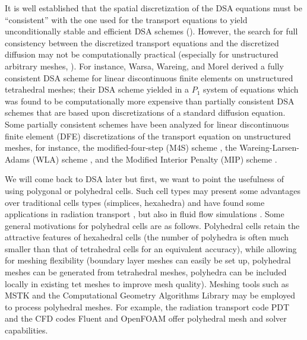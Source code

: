 It is well established that the spatial discretization of the DSA equations
must be ``consistent'' with the one used for the \sn transport equations to
yield unconditionally stable and efficient DSA schemes
(\cite{dsa_ref,larsen_dsa,consistent_p1,m4s,wla,mip}). However, the search for full
consistency between the discretized transport equations and the discretized
diffusion may not be computationally practical (especially for unstructured
arbitrary meshes, \cite{dsa_ref}). For instance, Warsa, Wareing, and
Morel \cite{consistent_p1} derived a fully consistent DSA scheme for linear
discontinuous finite elements on unstructured tetrahedral meshes; their DSA
scheme yielded in a $P_1$ system of equations which was found to be
computationally more expensive than partially consistent DSA schemes that are
based upon discretizations of a standard diffusion equation. Some partially 
consistent schemes have been analyzed for linear discontinuous finite element
(DFE) discretizations of the transport equation on unstructured meshes, for
instance, the modified-four-step (M4S) scheme \cite{m4s}, the
Wareing-Larsen-Adams (WLA) scheme \cite{wla}, and the Modified Interior
Penalty (MIP) scheme \cite{mip}.


We will come back to DSA later but first, we want to point the usefulness of
using polygonal or polyhedral cells. Such cell types may present some advantages over
traditional cells types (simplices, hexahedra) and have found some
applications in radiation transport \cite{pwld_2d,pwld_3d,cfm_dfm}, but also in fluid
flow simulations \cite{fluent,fluent2,fluentbio}. Some general motivations for
polyhedral cells are as follows. Polyhedral cells retain the attractive
features of hexahedral
cells  (the number of polyhedra is often much smaller than that of tetrahedral
cells for an equivalent accuracy), while allowing for meshing
flexibility (boundary layer meshes can easily be set up, polyhedral meshes can
be generated from tetrahedral meshes, polyhedra can be included locally in
existing tet meshes to improve mesh quality). Meshing tools such as MSTK
\cite{mstk} and the Computational Geometry Algorithms Library \cite{cgal} may
be employed to process polyhedral meshes. For example, the radiation transport
code PDT and the CFD codes Fluent and OpenFOAM offer polyhedral mesh and
solver capabilities.

